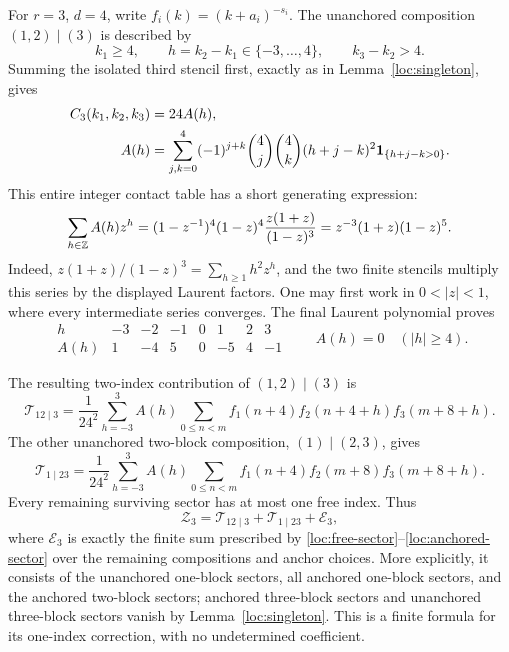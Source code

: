 For $r=3$, $d=4$, write $f_i(k)=(k+a_i)^{-s_i}$.  The unanchored
composition $(1,2)\mid(3)$ is described by
\[
 k_1\ge4,\qquad h=k_2-k_1\in\{-3,\ldots,4\},
 \qquad k_3-k_2>4.
\]
Summing the isolated third stencil first, exactly as in
Lemma~\ref{loc:singleton}, gives
\begin{align}
 C_3(k_1,k_2,k_3)&=24A(h),\label{loc:rank3-contact}\\
 A(h)&=\sum_{j,k=0}^4(-1)^{j+k}\binom4j\binom4k
                  (h+j-k)^2\mathbf 1_{\{h+j-k>0\}}.
                  \label{loc:rank3-A}
\end{align}
This entire integer contact table has a short generating expression:
\begin{equation}
 \sum_{h\in\mathbb Z}A(h)z^h
   =(1-z^{-1})^4(1-z)^4\frac{z(1+z)}{(1-z)^3}
   =z^{-3}(1+z)(1-z)^5.
 \label{loc:rank3-generating}
\end{equation}
Indeed, $z(1+z)/(1-z)^3=\sum_{h\ge1}h^2z^h$, and the two finite
stencils multiply this series by the displayed Laurent factors.
One may first work in $0<|z|<1$, where every intermediate series
converges.  The final Laurent polynomial proves
\[
\begin{array}{c|rrrrrrr}
 h&-3&-2&-1&0&1&2&3\\\hline
 A(h)&1&-4&5&0&-5&4&-1
\end{array}
\qquad A(h)=0\quad(|h|\ge4).
\]

The resulting two-index contribution of $(1,2)\mid(3)$ is
\begin{equation}
 \mathcal T_{12\mid3}
  =\frac1{24^2}\sum_{h=-3}^3 A(h)
       \sum_{0\le n<m}
       f_1(n+4)f_2(n+4+h)f_3(m+8+h).
 \label{loc:rank3-first}
\end{equation}
The other unanchored two-block composition, $(1)\mid(2,3)$, gives
\begin{equation}
 \mathcal T_{1\mid23}
  =\frac1{24^2}\sum_{h=-3}^3 A(h)
       \sum_{0\le n<m}
       f_1(n+4)f_2(m+8)f_3(m+8+h).
 \label{loc:rank3-second}
\end{equation}
Every remaining surviving sector has at most one free index.  Thus
\begin{equation}
 \mathcal Z_3=\mathcal T_{12\mid3}+\mathcal T_{1\mid23}
                         +\mathcal E_3,
 \label{loc:rank3-decomposition}
\end{equation}
where $\mathcal E_3$ is exactly the finite sum prescribed by
\eqref{loc:free-sector}--\eqref{loc:anchored-sector} over the remaining
compositions and anchor choices.  More explicitly, it consists of the
unanchored one-block sectors, all anchored one-block sectors, and the
anchored two-block sectors; anchored three-block sectors and
unanchored three-block sectors vanish by Lemma~\ref{loc:singleton}.
This is a finite formula for its one-index correction, with no
undetermined coefficient.

